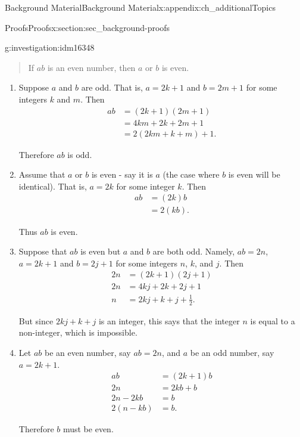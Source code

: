 \documentclass[oneside,10pt,]{book}
\numberwithin{equation}{chapter}
\newcommand{\amp}{&}
\begin{document}
\begin{appendixptx}{Background Material}{}{Background Material}{}{}{x:appendix:ch_additionalTopics}
\begin{sectionptx}{Proofs}{}{Proofs}{}{}{x:section:sec_background-proofs}
\begin{introduction}{}
\begin{investigation}{}{g:investigation:idm16348}
\begin{quote}
If \(a b\) is an even number, then \(a\) or \(b\) is even.%
\end{quote}
%
\begin{enumerate}
\item{}Suppose \(a\) and \(b\) are odd. That is, \(a=2k+1\) and \(b=2m+1\) for some integers \(k\) and \(m\). Then%
\begin{align*}
ab \amp =(2k+1)(2m+1)\\
\amp =4km+2k+2m+1\\
\amp =2(2km+k+m)+1.
\end{align*}
%
\par
Therefore \(ab\) is odd.%
\item{}Assume that \(a\) or \(b\) is even - say it is \(a\) (the case where \(b\) is even will be identical). That is, \(a=2k\) for some integer \(k\). Then%
\begin{align*}
ab \amp =(2k)b\\
\amp =2(kb).
\end{align*}
%
\par
Thus \(ab\) is even.%
\item{}Suppose that \(ab\) is even but \(a\) and \(b\) are both odd. Namely, \(ab = 2n\), \(a=2k+1\) and \(b=2j+1\) for some integers \(n\), \(k\), and \(j\). Then%
\begin{align*}
2n \amp =(2k+1)(2j+1)\\
2n \amp =4kj+2k+2j+1\\
n \amp = 2kj+k+j+\frac{1}{2}.
\end{align*}
%
\par
But since \(2kj+k+j\) is an integer, this says that the integer \(n\) is equal to a non-integer, which is impossible.%
\item{}Let \(ab\) be an even number, say \(ab=2n\), and \(a\) be an odd number, say \(a=2k+1\).%
\begin{align*}
ab \amp =(2k+1)b\\
2n \amp =2kb+b\\
2n-2kb\amp =b\\
2(n-kb)\amp =b.
\end{align*}
%
\par
Therefore \(b\) must be even.%
\end{enumerate}
%
\end{investigation}

\end{introduction}
\end{sectionptx}
\end{appendixptx}
\end{document}
